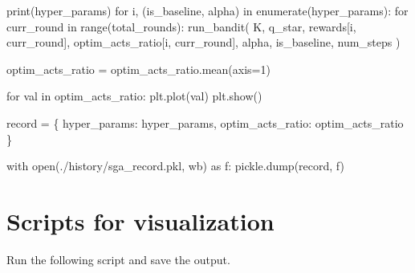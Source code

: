 \documentclass[
  letterpaper,
]{krantz}
\makeatletter
\newenvironment{Shaded}{\begin{snugshade}}{\end{snugshade}}
\newcommand{\BuiltInTok}[1]{\textcolor[rgb]{0.00,0.23,0.31}{#1}}
\newcommand{\ControlFlowTok}[1]{\textcolor[rgb]{0.00,0.23,0.31}{#1}}
\newcommand{\DecValTok}[1]{\textcolor[rgb]{0.68,0.00,0.00}{#1}}
\newcommand{\ImportTok}[1]{\textcolor[rgb]{0.00,0.46,0.62}{#1}}
\newcommand{\KeywordTok}[1]{\textcolor[rgb]{0.00,0.23,0.31}{#1}}
\newcommand{\NormalTok}[1]{\textcolor[rgb]{0.00,0.23,0.31}{#1}}
\newcommand{\OperatorTok}[1]{\textcolor[rgb]{0.37,0.37,0.37}{#1}}
\newcommand{\StringTok}[1]{\textcolor[rgb]{0.13,0.47,0.30}{#1}}
\newenvironment{kframe}{%
\medskip{}
\setlength{\fboxsep}{.8em}
 \def\at@end@of@kframe{}%
 \ifinner\ifhmode%
  \def\at@end@of@kframe{\end{minipage}}%
  \begin{minipage}{\columnwidth}%
 \fi\fi%
 \def\FrameCommand##1{\hskip\@totalleftmargin \hskip-\fboxsep
 \colorbox{shadecolor}{##1}\hskip-\fboxsep
     \hskip-\linewidth \hskip-\@totalleftmargin \hskip\columnwidth}%
 \MakeFramed {\advance\hsize-\width
   \@totalleftmargin\z@ \linewidth\hsize
   \@setminipage}}%
 {\par\unskip\endMakeFramed%
 \at@end@of@kframe}
\renewenvironment{Shaded}{\begin{kframe}}{\end{kframe}}
\theoremstyle{plain}
\theoremstyle{definition}
\theoremstyle{definition}
\theoremstyle{remark}
\makeatother
\begin{document}
\begin{codelisting}
\begin{Shaded}
\begin{Highlighting}[]
    \BuiltInTok{print}\NormalTok{(hyper\_params)}
    \ControlFlowTok{for}\NormalTok{ i, (is\_baseline, alpha) }\KeywordTok{in} \BuiltInTok{enumerate}\NormalTok{(hyper\_params):}
        \ControlFlowTok{for}\NormalTok{ curr\_round }\KeywordTok{in} \BuiltInTok{range}\NormalTok{(total\_rounds):}
\NormalTok{            run\_bandit(}
\NormalTok{                K,}
\NormalTok{                q\_star,}
\NormalTok{                rewards[i, curr\_round],}
\NormalTok{                optim\_acts\_ratio[i, curr\_round],}
\NormalTok{                alpha,}
\NormalTok{                is\_baseline,}
\NormalTok{                num\_steps}
\NormalTok{                )}
    
\NormalTok{    optim\_acts\_ratio }\OperatorTok{=}\NormalTok{ optim\_acts\_ratio.mean(axis}\OperatorTok{=}\DecValTok{1}\NormalTok{)}
    
    \ControlFlowTok{for}\NormalTok{ val }\KeywordTok{in}\NormalTok{ optim\_acts\_ratio:}
\NormalTok{        plt.plot(val)}
\NormalTok{    plt.show()}
    
\NormalTok{    record }\OperatorTok{=}\NormalTok{ \{}
            \StringTok{\textquotesingle{}hyper\_params\textquotesingle{}}\NormalTok{: hyper\_params,}
            \StringTok{\textquotesingle{}optim\_acts\_ratio\textquotesingle{}}\NormalTok{: optim\_acts\_ratio}
\NormalTok{            \}}
    
    \ControlFlowTok{with} \BuiltInTok{open}\NormalTok{(}\StringTok{\textquotesingle{}./history/sga\_record.pkl\textquotesingle{}}\NormalTok{, }\StringTok{\textquotesingle{}wb\textquotesingle{}}\NormalTok{) }\ImportTok{as}\NormalTok{ f:}
\NormalTok{         pickle.dump(record, f)}
\end{Highlighting}
\end{Shaded}

\end{codelisting}

\section{Scripts for visualization}\label{scripts-for-visualization}

Run the following script and save the output.
\end{document}
